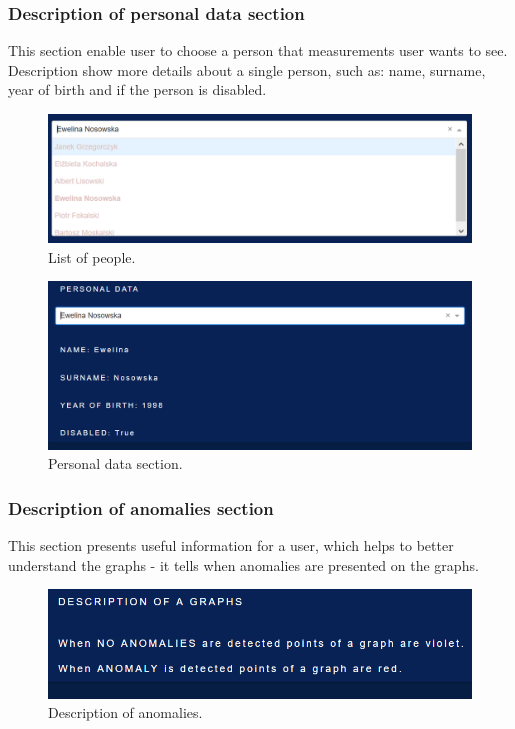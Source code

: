 \documentclass[a4paper,12pt,oneside]{article}
\begin{document}
\newpage
\subsubsection{Description of personal data section}
This section enable user to choose a person that measurements user wants to see.
Description show more details about a single person, such as: name, surname, year of birth and if the person is disabled.

\begin{figure}[ht]
\centering
\includegraphics[width=1\textwidth]{lista.PNG}
\caption{List of people.}
\label{fig:k1}
\end{figure}

\begin{figure}[ht]
\centering
\includegraphics[width=1\textwidth]{dataper.PNG}
\caption{Personal data section.}
\label{fig:k1}
\end{figure}

\newpage
\subsubsection{Description of anomalies section}
This section presents useful information for a user, which helps to better understand the graphs - it tells when anomalies are presented on the graphs.

\begin{figure}[ht]
\centering
\includegraphics[width=1\textwidth]{description.PNG}
\caption{Description of anomalies.}
\label{fig:k1}
\end{figure}
\end{document}
